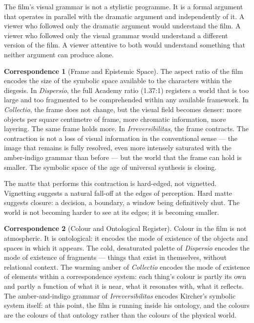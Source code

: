\documentclass[12pt, a4paper, twoside]{memoir}
\theoremstyle{definition}
\newtheorem{correspondence}{Correspondence}[chapter]
\theoremstyle{remark}
\begin{document}
The film's visual grammar is not a stylistic programme. It is a formal argument that operates in parallel with the dramatic argument and independently of it. A viewer who followed only the dramatic argument would understand the film. A viewer who followed only the visual grammar would understand a different version of the film. A viewer attentive to both would understand something that neither argument can produce alone.

\begin{correspondence}[Frame and Epistemic Space]
The aspect ratio of the film encodes the size of the symbolic space available to the characters within the diegesis. In \textit{Dispersio}, the full Academy ratio (1.37:1) registers a world that is too large and too fragmented to be comprehended within any available framework. In \textit{Collectio}, the frame does not change, but the visual field becomes denser: more objects per square centimetre of frame, more chromatic information, more layering. The same frame holds more. In \textit{Irreversibilitas}, the frame contracts. The contraction is not a loss of visual information in the conventional sense --- the image that remains is fully resolved, even more intensely saturated with the amber-indigo grammar than before --- but the world that the frame can hold is smaller. The symbolic space of the age of universal synthesis is closing.
\end{correspondence}

The matte that performs this contraction is hard-edged, not vignetted. Vignetting suggests a natural fall-off at the edges of perception. Hard matte suggests closure: a decision, a boundary, a window being definitively shut. The world is not becoming harder to see at its edges; it is becoming smaller.

\begin{correspondence}[Colour and Ontological Register]
Colour in the film is not atmospheric. It is ontological: it encodes the mode of existence of the objects and spaces in which it appears. The cold, desaturated palette of \textit{Dispersio} encodes the mode of existence of fragments --- things that exist in themselves, without relational context. The warming amber of \textit{Collectio} encodes the mode of existence of elements within a correspondence system: each thing's colour is partly its own and partly a function of what it is near, what it resonates with, what it reflects. The amber-and-indigo grammar of \textit{Irreversibilitas} encodes Kircher's symbolic system itself: at this point, the film is running inside his ontology, and the colours are the colours of that ontology rather than the colours of the physical world.
\end{correspondence}
\end{document}
